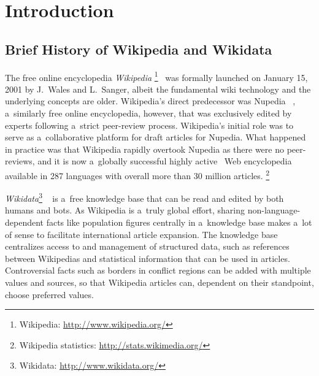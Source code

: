 \documentclass{sig-alternate}
\newcommand{\inlinelistingsize}{\fontsize{8pt}{11pt}}
\let\oldurl\url
\renewcommand{\url}[1]{\inlinelistingsize\oldurl{#1}}
\begin{document}



\section{Introduction}
\label{sec:introduction}
\selectfont

\subsection{Brief History of Wikipedia and Wikidata}

The free online encyclopedia \emph{Wikipedia}%
\footnote{Wikipedia: \url{http://www.wikipedia.org/}}~\cite{sanger05historywikipedia} was formally launched
on January 15, 2001 by J.~Wales
and L.~Sanger,
albeit the fundamental wiki technology
and the underlying concepts are older.
Wikipedia's direct predecessor was Nupedia%
~\cite{sanger05historywikipedia},
a~similarly free online encyclopedia,
however, that was exclusively edited by experts
following a~strict peer-review process.
Wikipedia's initial role was to serve
as a~collaborative platform for draft articles for Nupedia.
What happened in practice was that Wikipedia
rapidly overtook Nupedia as there were no peer-reviews,
and it is now a~globally successful
highly active~\cite{steiner2013bots} Web encyclopedia
available in 287 languages with overall
more than 30 million articles.%
\footnote{Wikipedia statistics: \url{http://stats.wikimedia.org/}}

\emph{Wikidata}\footnote{Wikidata: \url{http://www.wikidata.org/}}%
~\cite{vrandecic2012wikidata}
is a~free knowledge base that can be read
and edited by both humans and bots.
As Wikipedia is a~truly global effort,
sharing non-language-dependent facts
like population figures centrally
in a~knowledge base makes a~lot of sense
to facilitate international article expansion.
The knowledge base centralizes access to
and management of structured data,
such as references between Wikipedias
and statistical information that can be used in articles.
Controversial facts such as borders in conflict regions
can be added with multiple values and sources,
so that Wikipedia articles can,
dependent on their standpoint, choose preferred values.
\end{document}
